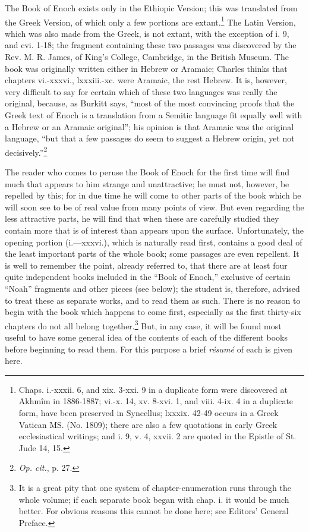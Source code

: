 
The Book of Enoch exists only in the Ethiopic
Version; this was translated from the Greek Version,
of which only a few portions are extant.\footnote{Chaps. i.-xxxii. 6, and xix. 3-xxi. 9 in a duplicate form
were discovered at Akhmîm in 1886-1887; vi.-x. 14, xv.
8-xvi. 1, and viii. 4-ix. 4 in a duplicate form, have been
preserved in Syncellus; lxxxix. 42-49 occurs in a Greek
Vatican MS. (No. 1809); there are also a few quotations in
early Greek ecclesiastical writings; and i. 9, v. 4, xxvii. 2
are quoted in the Epistle of St. Jude 14, 15.} The Latin
Version, which was also made from the Greek, is not
extant, with the exception of i. 9, and cvi. 1-18;
the fragment containing these two passages was
discovered by the Rev. M. R. James, of King’s
College, Cambridge, in the British Museum. The
book was originally written either in Hebrew or
Aramaic; Charles thinks that chapters vi.-xxxvi.,
lxxxiii.-xc. were Aramaic, the rest Hebrew. It is,
however, very difficult to say for certain which of
these two languages was really the original, because,
as Burkitt says, “most of the most convincing proofs
that the Greek text of Enoch is a translation from a
Semitic language fit equally well with a Hebrew or
an Aramaic original”; his opinion is that Aramaic
was the original language, “but that a few passages
do seem to suggest a Hebrew origin, yet not decisively.”\footnote{\emph{Op. cit.}, p. 27.}


The reader who comes to peruse the Book of Enoch
for the first time will find much that appears to him
strange and unattractive; he must not, however,
be repelled by this; for in due time he will come to
other parts of the book which he will soon see to be
of real value from many points of view. But even
regarding the less attractive parts, he will find that
when these are carefully studied they contain more
that is of interest than appears upon the surface.
Unfortunately, the opening portion (i.—xxxvi.), which
is naturally read first, contains a good deal of the
least important parts of the whole book; some
passages are even repellent. It is well to remember
the point, already referred to, that there are at least
four quite independent books included in the “Book
of Enoch,” exclusive of certain “Noah” fragments
and other pieces (see below); the student is, therefore,
advised to treat these as separate works, and
to read them as such. There is no reason to begin
with the book which happens to come first, especially
as the first thirty-six chapters do not all belong
together.\footnote{It is a great pity that one system of chapter-enumeration
runs through the whole volume; if each separate book began
with chap. i. it would be much better. For obvious reasons
this cannot be done here; see Editors’ General Preface.} But, in any case, it will be found most
useful to have some general idea of the contents of
each of the different books before beginning to read
them. For this purpose a brief \emph{résumé} of each is
given here.

